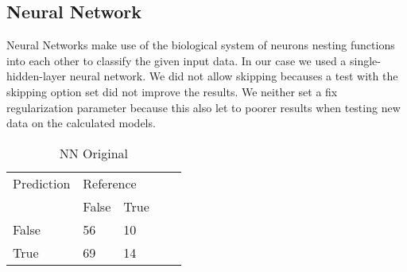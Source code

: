 \subsection{Neural Network}


Neural Networks make use of the biological system of neurons nesting functions into each other to classify the given input data. In our case we used a single-hidden-layer neural network. We did not allow skipping becauses a test with the skipping option set did not improve the results. We neither set a fix regularization parameter because this also let to poorer results when testing new data on the calculated models.

\begin{table}[!htbp]
\centering
\caption{NN Original}
\vspace{0.1cm}
\label{nn-orig}
\begin{tabular}{|l|ll|ll}
\cline{1-3}
Prediction & \multicolumn{2}{l|}{Reference} &  &  \\
           & False          & True          &  &  \\ \cline{2-3}
False      & 56              & 10             &  &  \\
True       & 69              & 14             &  &  \\ \cline{1-3}
\end{tabular}
\end{table}

